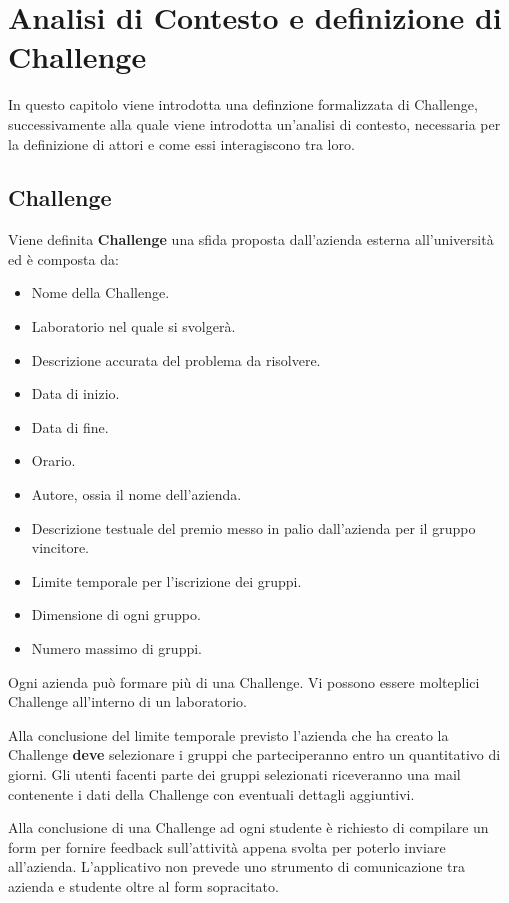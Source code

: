 \chapter{Analisi di Contesto e definizione di Challenge}

In questo capitolo viene introdotta una definzione formalizzata di Challenge, successivamente alla quale viene introdotta un'analisi di contesto, necessaria per la definizione di attori e come essi interagiscono tra loro.

\section{Challenge}
Viene definita \textbf{Challenge} una sfida proposta dall'azienda esterna all'università ed è composta da:

\begin{itemize}
    \item Nome della Challenge.
    \item Laboratorio nel quale si svolgerà.
    \item Descrizione accurata del problema da risolvere.
    \item Data di inizio. 
    \item Data di fine.
    \item Orario.
    \item Autore, ossia il nome dell'azienda.
    \item Descrizione testuale del premio messo in palio dall'azienda per il gruppo vincitore.
    \item Limite temporale per l'iscrizione dei gruppi.
    \item Dimensione di ogni gruppo. 
    \item Numero massimo di gruppi.
\end{itemize}

Ogni azienda può formare più di una Challenge. Vi possono essere molteplici Challenge all'interno di un laboratorio.

Alla conclusione del limite temporale previsto l'azienda che ha creato la Challenge \textbf{deve} selezionare i gruppi che parteciperanno entro un quantitativo di giorni. Gli utenti facenti parte dei gruppi selezionati riceveranno una mail contenente i dati della Challenge con eventuali dettagli aggiuntivi.

Alla conclusione di una Challenge ad ogni studente è richiesto di compilare un form per fornire feedback sull'attività appena svolta per poterlo inviare all'azienda.
L'applicativo non prevede uno strumento di comunicazione tra azienda e studente oltre al form sopracitato.


